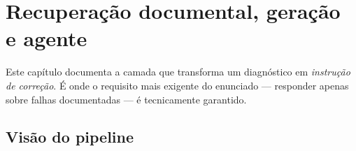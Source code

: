 \chapter{Recuperação documental, geração e agente}
\label{cap:rag}

Este capítulo documenta a camada que transforma um diagnóstico em
\emph{instrução de correção}. É onde o requisito mais exigente do enunciado
--- responder apenas sobre falhas documentadas --- é tecnicamente garantido.

\section{Visão do pipeline}

